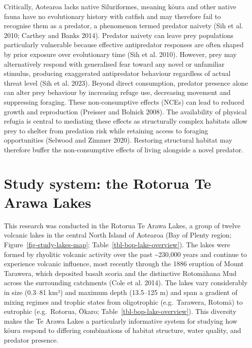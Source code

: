 \documentclass[
  12pt,
  a4paper,
  oneside]{scrbook}
\begin{document}
Critically, Aotearoa lacks native Siluriformes, meaning kōura and other
native fauna have no evolutionary history with catfish and may therefore
fail to recognise them as a predator, a phenomenon termed predator
naivety (Sih et al. 2010; Carthey and Banks 2014). Predator naivety can
leave prey populations particularly vulnerable because effective
antipredator responses are often shaped by prior exposure over
evolutionary time (Sih et al. 2010). However, prey may alternatively
respond with generalised fear toward any novel or unfamiliar stimulus,
producing exaggerated antipredator behaviour regardless of actual threat
level (Sih et al. 2023). Beyond direct consumption, predator presence
alone can alter prey behaviour by increasing refuge use, decreasing
movement and suppressing foraging. These non-consumptive effects (NCEs)
can lead to reduced growth and reproduction (Preisser and Bolnick 2008).
The availability of physical refugia is central to mediating these
effects as structurally complex habitats allow prey to shelter from
predation risk while retaining access to foraging opportunities (Selwood
and Zimmer 2020). Restoring structural habitat may therefore buffer the
non-consumptive effects of living alongside a novel predator.

\section{Study system: the Rotorua Te Arawa
Lakes}\label{study-system-the-rotorua-te-arawa-lakes}

This research was conducted in the Rotorua Te Arawa Lakes, a group of
twelve volcanic lakes in the central North Island of Aotearoa (Bay of
Plenty region; Figure~\ref{fig-study-lakes-map};
Table~\ref{tbl-bop-lake-overview}). The lakes were formed by rhyolitic
volcanic activity over the past \textasciitilde230,000 years and
continue to experience volcanic influence, most recently through the
1886 eruption of Mount Tarawera, which deposited basalt scoria and the
distinctive Rotomāhana Mud across the surrounding catchments (Cole et
al. 2014). The lakes vary considerably in size (0.3--81 km²) and maximum
depth (13.5--125 m) and span a gradient of mixing regimes and trophic
states from oligotrophic (e.g.~Tarawera, Rotomā) to eutrophic
(e.g.~Rotorua, Ōkaro; Table~\ref{tbl-bop-lake-overview}). This diversity
makes the Te Arawa Lakes a particularly informative system for studying
how kōura respond to differing combinations of habitat structure, water
quality, and predator presence.
\end{document}
